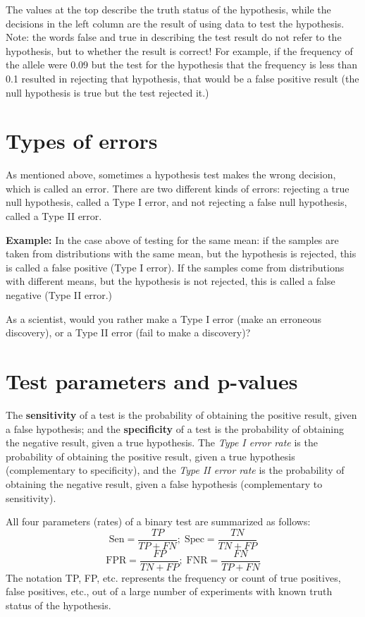 \documentclass[
  letterpaper,
  DIV=11,
  numbers=noendperiod]{scrreprt}
\begin{document}
The values at the top describe the truth status of the hypothesis, while
the decisions in the left column are the result of using data to test
the hypothesis. Note: the words false and true in describing the test
result do not refer to the hypothesis, but to whether the result is
correct! For example, if the frequency of the allele were 0.09 but the
test for the hypothesis that the frequency is less than 0.1 resulted in
rejecting that hypothesis, that would be a false positive result (the
null hypothesis is true but the test rejected it.)

\section{Types of errors}\label{types-of-errors}

As mentioned above, sometimes a hypothesis test makes the wrong
decision, which is called an error. There are two different kinds of
errors: rejecting a true null hypothesis, called a Type I error, and not
rejecting a false null hypothesis, called a Type II error.

\textbf{Example:} In the case above of testing for the same mean: if the
samples are taken from distributions with the same mean, but the
hypothesis is rejected, this is called a false positive (Type I error).
If the samples come from distributions with different means, but the
hypothesis is not rejected, this is called a false negative (Type II
error.)

As a scientist, would you rather make a Type I error (make an erroneous
discovery), or a Type II error (fail to make a discovery)?

\section{Test parameters and
p-values}\label{test-parameters-and-p-values}

The \textbf{sensitivity} of a test is the probability of obtaining the
positive result, given a false hypothesis; and the \textbf{specificity}
of a test is the probability of obtaining the negative result, given a
true hypothesis. The \emph{Type I error rate} is the probability of
obtaining the positive result, given a true hypothesis (complementary to
specificity), and the \emph{Type II error rate} is the probability of
obtaining the negative result, given a false hypothesis (complementary
to sensitivity).

All four parameters (rates) of a binary test are summarized as follows:
\[\text{Sen} = \frac{TP}{TP+FN};  \; \text{Spec} = \frac{TN}{TN+FP}\]
\[\text{FPR} = \frac{FP}{TN+FP};  \; \text{FNR} = \frac{FN}{TP+FN}\] The
notation TP, FP, etc. represents the frequency or count of true
positives, false positives, etc., out of a large number of experiments
with known truth status of the hypothesis.
\end{document}
